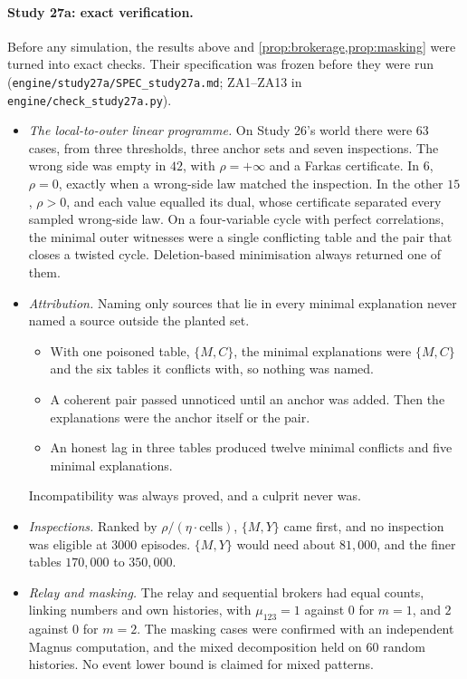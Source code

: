 \documentclass[11pt]{article}
\theoremstyle{definition}\newtheorem{definition}[theorem]{Definition}\newtheorem{remark}[theorem]{Remark}\newtheorem{example}[theorem]{Example}\newtheorem{problem}[theorem]{Open problem}\crefname{problem}{Problem}{Problems}
\begin{document}
\paragraph{Study 27a: exact verification.} Before any simulation, the results above and \cref{prop:brokerage,prop:masking} were turned into exact checks. Their specification was frozen before they were run (\texttt{engine/study27a/SPEC\_study27a.md}; ZA1--ZA13 in \texttt{engine/check\_study27a.py}).
\begin{itemize}
\item \emph{The local-to-outer linear programme.} On Study 26's world there were $63$ cases, from three thresholds, three anchor sets and seven inspections. The wrong side was empty in $42$, with $\rho=+\infty$ and a Farkas certificate. In $6$, $\rho=0$, exactly when a wrong-side law matched the inspection. In the other $15$, $\rho>0$, and each value equalled its dual, whose certificate separated every sampled wrong-side law. On a four-variable cycle with perfect correlations, the minimal outer witnesses were a single conflicting table and the pair that closes a twisted cycle. Deletion-based minimisation always returned one of them.
\item \emph{Attribution.} Naming only sources that lie in every minimal explanation never named a source outside the planted set.
\begin{itemize}
\item With one poisoned table, $\{M,C\}$, the minimal explanations were $\{M,C\}$ and the six tables it conflicts with, so nothing was named.
\item A coherent pair passed unnoticed until an anchor was added. Then the explanations were the anchor itself or the pair.
\item An honest lag in three tables produced twelve minimal conflicts and five minimal explanations.
\end{itemize}
Incompatibility was always proved, and a culprit never was.
\item \emph{Inspections.} Ranked by $\rho/(\eta\cdot\text{cells})$, $\{M,Y\}$ came first, and no inspection was eligible at $3000$ episodes. $\{M,Y\}$ would need about $81{,}000$, and the finer tables $170{,}000$ to $350{,}000$.
\item \emph{Relay and masking.} The relay and sequential brokers had equal counts, linking numbers and own histories, with $\mu_{123}=1$ against $0$ for $m=1$, and $2$ against $0$ for $m=2$. The masking cases were confirmed with an independent Magnus computation, and the mixed decomposition held on $60$ random histories. No event lower bound is claimed for mixed patterns.

\end{itemize}
\end{document}
